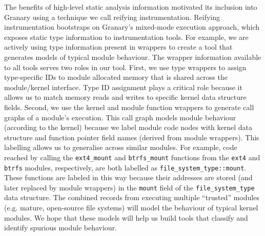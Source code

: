\documentclass[preprint]{sigplanconf}
\begin{document}
The benefits of high-level static analysis information motivated its inclusion into Granary using a technique we call reifying instrumentation. Reifying instrumentation bootstraps on Granary's mixed-mode execution approach, which exposes static type information to instrumentation tools. For example, we are actively using type information present in wrappers to create a tool that generates models of typical module behaviour. The wrapper information available to all tools serves two roles in our tool. First, we use type wrappers to assign type-specific IDs to module allocated memory that is shared across the module/kernel interface. Type ID assignment plays a critical role because it allows us to match memory reads and writes to specific kernel data structure fields. Second, we use the kernel and module function wrappers to generate call graphs of a module's execution. This call graph models module behaviour (according to the kernel) because we label module code nodes with kernel data structure and function pointer field names (derived from module wrappers). This labelling allows us to generalise across similar modules. For example, code reached by calling the \texttt{ext4\_mount} and \texttt{btrfs\_mount} functions from the \texttt{ext4} and \texttt{btrfs} modules, respectively, are both labelled as \texttt{file\_system\_type::mount}. These functions are labeled in this way because their addresses are stored (and later replaced by module wrappers) in the \texttt{mount} field of the \texttt{file\_system\_type} data structure. The combined records from executing multiple ``trusted'' modules (e.g. mature, open-source file systems) will model the behaviour of typical kernel modules. We hope that these models will help us build tools that classify and identify spurious module behaviour.






\end{document}
